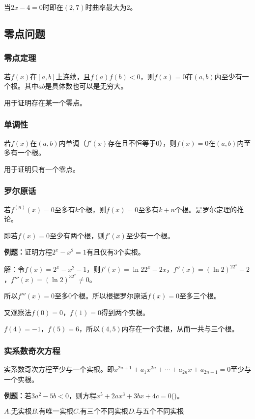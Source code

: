 \documentclass[UTF8, 12pt]{ctexart}
\begin{document}
当$2x-4=0$时即在$(2,7)$时曲率最大为2。

\subsection{零点问题}

\subsubsection{零点定理}

若$f(x)$在$[a,b]$上连续，且$f(a)f(b)<0$，则$f(x)=0$在$(a,b)$内至少有一个根。其中$ab$是具体数也可以是无穷大。

用于证明存在某一个零点。

\subsubsection{单调性}

若$f(x)$在$(a,b)$内单调（$f'(x)$存在且不恒等于0），则$f(x)=0$在$(a,b)$内至多有一个根。

用于证明只有一个零点。

\subsubsection{罗尔原话}

若$f^{(n)}(x)=0$至多有$k$个根，则$f(x)=0$至多有$k+n$个根。是罗尔定理的推论。

即若$f(x)=0$至少有两个根，则$f'(x)$至少有一个根。

\textbf{例题：}证明方程$2^x-x^2=1$有且仅有3个实根。

解：令$f(x)=2^x-x^2-1$，则$f'(x)=\ln22^x-2x$，$f''(x)=(\ln2)^22^x-2$，$f'''(x)=(\ln2)^32^x\neq 0$。

所以$f'''(x)=0$至多0个根。所以根据罗尔原话$f(x)=0$至多三个根。

又观察法$f(0)=0$，$f(1)=0$得到两个实根。

$f(4)=-1$，$f(5)=6$，所以$(4,5)$内存在一个实根，从而一共与三个根。

\subsubsection{实系数奇次方程}

实系数奇次方程至少与一个实根。即$x^{2n+1}+a_1x^{2n}+\cdots+a_{2n}x+a_{2n+1}=0$至少与一个实根。

\textbf{例题：}若$3a^2-5b<0$，则方程$x^5+2ax^3+3bx+4c=0$()。

$A.\text{无实根}$\qquad$B.\text{有唯一实根}$\qquad$C.\text{有三个不同实根}$\qquad$D.\text{与五个不同实根}$
\end{document}
